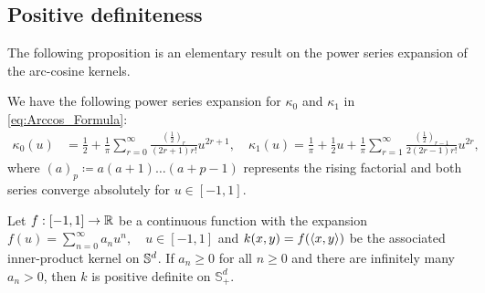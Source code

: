 %

\subsection{Positive definiteness}
\label{subsec:D_PDNTK}

The following proposition is an elementary result on the power series expansion of the arc-cosine kernels.
\begin{proposition}
  \label{prop:D_ACK_PS}
  We have the following power series expansion for $\kappa_0$ and $\kappa_1$ in \cref{eq:Arccos_Formula}:
  \begin{align}
    \kappa_0(u) &= \frac{1}{2} + \frac{1}{\pi} \sum_{r=0}^\infty \frac{\left(\frac{1}{2}\right)_r}{(2r+1) r!} u^{2r+1},
    \quad
    \kappa_1(u) = \frac{1}{\pi} + \frac{1}{2}u + \frac{1}{\pi} \sum_{r = 1}^{\infty} \frac{\left(\frac{1}{2}\right)_{r-1}}{2(2r-1) r!} u^{2r},
  \end{align}
  where $(a)_p \coloneqq a(a+1)\dots(a+p-1)$ represents the rising factorial
  and both series converge absolutely for $u \in [-1,1]$.
\end{proposition}

\begin{lemma}
  \label{lem:B_PDSphere}
  Let $f: [-1,1] \to \mathbb{R}$ be a continuous function with the expansion
  $f(u) = \sum^{\infty}_{n=0}a_n u^n, \quad u \in [-1,1]$
  and $k(x,y) = f(\left\langle{x,y}\right\rangle)$ be the associated inner-product kernel on $\mathbb{S}^{d}$.
  If $a_{n}\geq 0$ for all $n \geq 0$ and there are infinitely many $a_n > 0$, then $k$ is
  positive definite on $\mathbb{S}^{d}_{+}$.
\end{lemma}


